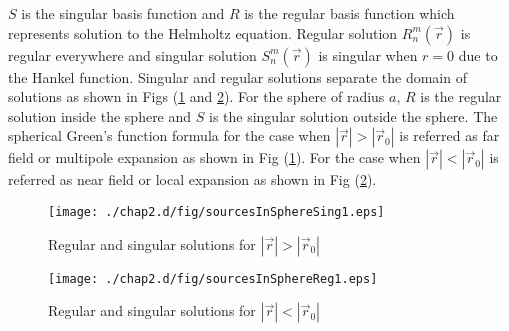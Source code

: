 \par 
 $S$ is the singular basis  function and $R$ is the regular basis function which represents solution to the Helmholtz equation. Regular solution $R^{m}_{n}(\vec{r})$  is regular everywhere and singular solution $ S_{n}^{m}( \vec{r})$ is singular when $r=0$ due to the Hankel function.  Singular and regular solutions   separate the domain of solutions as  shown in  Figs (\ref{rrss1} and \ref{rrss2}). For the sphere of radius $a$, $ R$ is the regular solution inside the sphere   and $S$ is the singular solution outside the sphere. The spherical Green's function formula for the case when $ |\vec{r}|>|\vec{r}_0|$ is referred as far field or multipole  expansion  as shown in Fig (\ref{rrss1}). For  the case when $ |\vec{r}|<|\vec{r}_0|$  is referred as  near field  or local expansion as shown in  Fig (\ref{rrss2}). 


\begin{figure}
\begin{center}
  \texttt{[image: ./chap2.d/fig/sourcesInSphereSing1.eps]}
\caption{ Regular and singular solutions for $|\vec{r}|>|\vec{r}_0|$}
\label{rrss1}
\end{center}
\end{figure}

\begin{figure}
\begin{center}
  \texttt{[image: ./chap2.d/fig/sourcesInSphereReg1.eps]}
\caption{ Regular and singular solutions  for $|\vec{r}|<|\vec{r}_0|$}
\label{rrss2}
\end{center}
\end{figure}
\newpage

